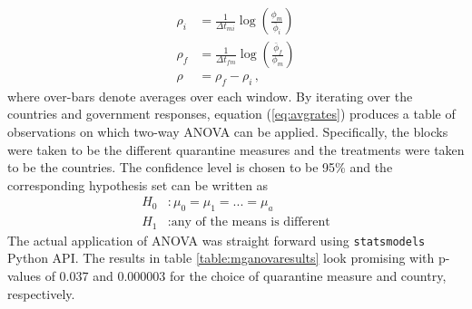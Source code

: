 \begin{align}
\rho_{i} &= \frac{1}{\Delta t_{mi}}\log(\frac{\phi_m}{\bar{\phi}_i})\nonumber \\
\rho_{f} &= \frac{1}{\Delta t_{fm}}\log(\frac{\bar{\phi}_{f}}{\phi_m})\nonumber \\
\rho &= \rho_{f}-\rho_{i} \,,
\label{eq:avgrates}
\end{align}
where over-bars denote averages over each window.
By iterating over the countries and government responses, equation (\ref{eq:avgrates}) produces a table of observations on which two-way ANOVA can be applied. Specifically,
the blocks were taken to be the different quarantine measures and the treatments were taken to be the countries. The confidence level is chosen to be 95\% and the corresponding hypothesis set can be written as
\begin{align}
    H_0 &: \mu_0 = \mu_1 = ... = \mu_a \nonumber\\
    H_1 &: \text{any of the means is different} \nonumber
\end{align}
The actual application of ANOVA was straight forward using \texttt{statsmodels} Python API. The results in table \ref{table:mganovaresults} look promising with p-values of 0.037 and 0.000003 for the choice of quarantine measure and country, respectively.

